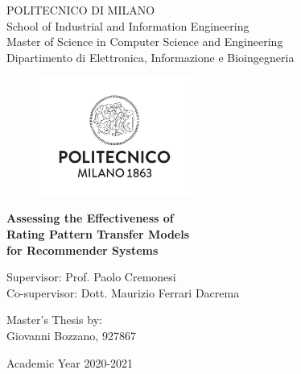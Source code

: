 \thispagestyle{empty}
\vspace*{-1.5cm} \bfseries{
\begin{center}
	\LARGE
	POLITECNICO DI MILANO\\
	\vspace*{0.3cm}
	\normalsize
	School of Industrial and Information Engineering\\
	Master of Science in Computer Science and Engineering\\
	Dipartimento di Elettronica, Informazione e Bioingegneria\\
	\vspace*{0.8cm}
	\begin{figure}[htbp]
		\begin{center}
			\includegraphics[width=5cm]{pictures/logo}
		\end{center}
	\end{figure}
	\vspace*{0.3cm} \LARGE
	\textbf{Assessing the Effectiveness of\\Rating Pattern Transfer Models\\for Recommender Systems}\\
	\vspace*{.75truecm} \large
\end{center}
\vspace*{2.0cm} \large
\begin{flushleft}
	Supervisor: Prof. Paolo Cremonesi\\
	Co-supervisor: Dott. Maurizio Ferrari Dacrema\\
\end{flushleft}
\vspace*{1.0cm}
\begin{flushright}
	Master's Thesis by:\\
	Giovanni Bozzano, 927867\\
\end{flushright}
\vspace*{1.0cm}
\begin{center}
	Academic Year 2020-2021
\end{center} \clearpage
}